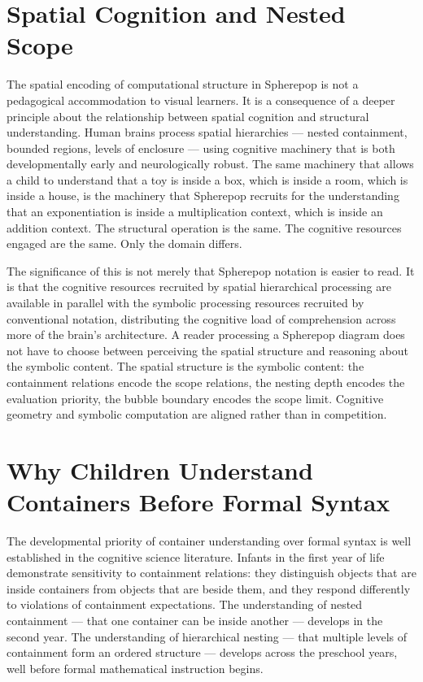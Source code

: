 \documentclass[12pt,openany]{book}
\theoremstyle{plain}
\theoremstyle{definition}
\theoremstyle{remark}
\begin{document}
\section*{Spatial Cognition and Nested Scope}

The spatial encoding of computational structure in Spherepop is not a pedagogical accommodation to visual learners. It is a consequence of a deeper principle about the relationship between spatial cognition and structural understanding. Human brains process spatial hierarchies — nested containment, bounded regions, levels of enclosure — using cognitive machinery that is both developmentally early and neurologically robust. The same machinery that allows a child to understand that a toy is inside a box, which is inside a room, which is inside a house, is the machinery that Spherepop recruits for the understanding that an exponentiation is inside a multiplication context, which is inside an addition context. The structural operation is the same. The cognitive resources engaged are the same. Only the domain differs.

The significance of this is not merely that Spherepop notation is easier to read. It is that the cognitive resources recruited by spatial hierarchical processing are available in parallel with the symbolic processing resources recruited by conventional notation, distributing the cognitive load of comprehension across more of the brain's architecture. A reader processing a Spherepop diagram does not have to choose between perceiving the spatial structure and reasoning about the symbolic content. The spatial structure is the symbolic content: the containment relations encode the scope relations, the nesting depth encodes the evaluation priority, the bubble boundary encodes the scope limit. Cognitive geometry and symbolic computation are aligned rather than in competition.

\section*{Why Children Understand Containers Before Formal Syntax}

The developmental priority of container understanding over formal syntax is well established in the cognitive science literature. Infants in the first year of life demonstrate sensitivity to containment relations: they distinguish objects that are inside containers from objects that are beside them, and they respond differently to violations of containment expectations. The understanding of nested containment — that one container can be inside another — develops in the second year. The understanding of hierarchical nesting — that multiple levels of containment form an ordered structure — develops across the preschool years, well before formal mathematical instruction begins.
\end{document}
